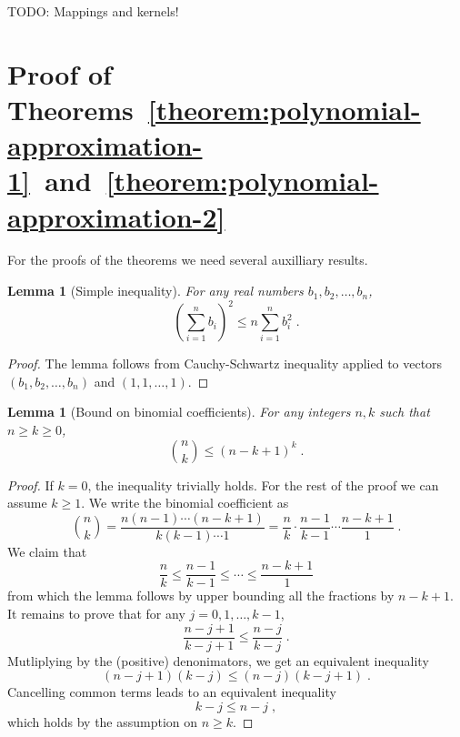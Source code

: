 \documentclass[12pt]{article}
\newtheorem{lemma}[definition]{Lemma}
\begin{document}
TODO: Mappings and kernels!

\section{Proof of Theorems~\ref{theorem:polynomial-approximation-1}~and~\ref{theorem:polynomial-approximation-2}}
\label{section:proof-of-polynomial-approximation}

For the proofs of the theorems we need several auxilliary results.

\begin{lemma}[Simple inequality]
\label{lemma:simple-inequality}
For any real numbers $b_1, b_2, \dots, b_n$,
$$
\left( \sum_{i=1}^n b_i \right)^2 \le n \sum_{i=1}^n b_i^2 \; .
$$
\end{lemma}

\begin{proof}
The lemma follows from Cauchy-Schwartz inequality applied to
vectors $(b_1, b_2, \dots, b_n)$ and $(1,1,\dots,1)$.
\end{proof}

\begin{lemma}[Bound on binomial coefficients]
\label{lemma:binomial-bound}
For any integers $n,k$ such that $n \ge k \ge 0$,
$$
\binom{n}{k} \le (n - k + 1)^k \; .
$$
\end{lemma}

\begin{proof}
If $k = 0$, the inequality trivially holds. For the rest of the proof we can
assume $k \ge 1$. We write the binomial coefficient as
$$
\binom{n}{k}
= \frac{n(n-1)\cdots(n-k+1)}{k(k-1) \cdots 1}
= \frac{n}{k} \cdot \frac{n-1}{k - 1} \cdots \frac{n-k+1}{1} \; .
$$
We claim that
$$
\frac{n}{k} \le \frac{n-1}{k - 1} \le \cdots \le \frac{n-k+1}{1}
$$
from which the lemma follows by upper bounding all the fractions by $n-k+1$.
It remains to prove that for any $j=0,1,\dots,k-1$,
$$
\frac{n - j + 1}{k - j + 1} \le \frac{n - j}{k - j} \; .
$$
Mutliplying by the (positive) denonimators, we get an equivalent inequality
$$
(n - j + 1)(k - j) \le (n - j)(k - j + 1) \; .
$$
Cancelling common terms leads to an equivalent inequality
$$
k - j \le n - j \; ,
$$
which holds by the assumption on $n \ge k$.
\end{proof}
\end{document}
